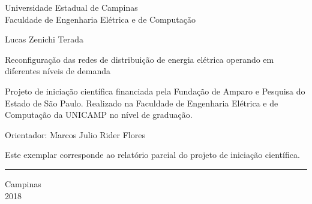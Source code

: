 \begin{center}
\large Universidade Estadual de Campinas\\
Faculdade de Engenharia Elétrica e de Computação
\end{center}

\vspace*{1.0cm}
\begin{center}
\large Lucas Zenichi Terada
\end{center}

    
\vspace*{1.3cm}
    
\begin{center}
    {\sc Reconfiguração das redes de distribuição de energia elétrica operando em diferentes níveis de demanda}
\end{center}
    
\vspace*{0.5cm}

    
\vspace*{1.0cm}
    
\begin{flushright}
\begin{minipage}{11.0cm}
Projeto de iniciação científica financiada pela Fundação de Amparo e Pesquisa do Estado de São Paulo. Realizado na Faculdade de Engenharia Elétrica e de Computação da UNICAMP no nível de graduação.
    
\vspace*{0.5cm}
    
\vspace*{1.0cm}
Orientador: Marcos Julio Rider Flores
    
\end{minipage}
\end{flushright}
    
\null \vfill
\begin{minipage}{7cm}
\small
Este exemplar corresponde ao relatório parcial do projeto de iniciação científica.    
\rule{6.9cm}{0.2mm} \hfill 
\end{minipage}
    
\null \vfill
\begin{center}
    Campinas\\2018
\end{center}
\thispagestyle{empty}
\newpage